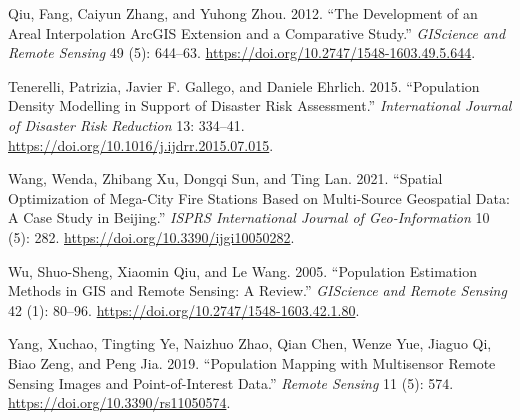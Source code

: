 \begin{CSLReferences}{1}{0}
\leavevmode{}%
Qiu, Fang, Caiyun Zhang, and Yuhong Zhou. 2012. {``The Development of an Areal Interpolation ArcGIS Extension and a Comparative Study.''} \emph{GIScience and Remote Sensing} 49 (5): 644--63. \url{https://doi.org/10.2747/1548-1603.49.5.644}.

\leavevmode{}%
Tenerelli, Patrizia, Javier F. Gallego, and Daniele Ehrlich. 2015. {``Population Density Modelling in Support of Disaster Risk Assessment.''} \emph{International Journal of Disaster Risk Reduction} 13: 334--41. \url{https://doi.org/10.1016/j.ijdrr.2015.07.015}.

\leavevmode{}%
Wang, Wenda, Zhibang Xu, Dongqi Sun, and Ting Lan. 2021. {``Spatial Optimization of Mega-City Fire Stations Based on Multi-Source Geospatial Data: A Case Study in Beijing.''} \emph{ISPRS International Journal of Geo-Information} 10 (5): 282. \url{https://doi.org/10.3390/ijgi10050282}.

\leavevmode{}%
Wu, Shuo-Sheng, Xiaomin Qiu, and Le Wang. 2005. {``Population Estimation Methods in GIS and Remote Sensing: A Review.''} \emph{GIScience and Remote Sensing} 42 (1): 80--96. \url{https://doi.org/10.2747/1548-1603.42.1.80}.

\leavevmode{}%
Yang, Xuchao, Tingting Ye, Naizhuo Zhao, Qian Chen, Wenze Yue, Jiaguo Qi, Biao Zeng, and Peng Jia. 2019. {``Population Mapping with Multisensor Remote Sensing Images and Point-of-Interest Data.''} \emph{Remote Sensing} 11 (5): 574. \url{https://doi.org/10.3390/rs11050574}.

\end{CSLReferences}



\address{%
Marios Batsaris\\
University of the Aegean\\%
Department of Geography\\ Mytilini, Greece\\
%
\url{https://www.mbatsaris.gr}\\%
\textit{ORCiD: \href{https://orcid.org/0000-0002-1805-3528}{0000-0002-1805-3528}}\\%
\href{mailto:m.batsaris@aegean.gr}{\nolinkurl{m.batsaris@aegean.gr}}%
}

\address{%
Dimitris Kavroudakis\\
University of the Aegean\\%
Department of Geography\\ Mytilini, Greece\\
%
\url{https://www.britannica.com/animal/bilby}\\%
\textit{ORCiD: \href{https://orcid.org/0000-0001-5782-3049}{0000-0001-5782-3049}}\\%
\href{mailto:dimitrisk@aegean.gr}{\nolinkurl{dimitrisk@aegean.gr}}%
}
